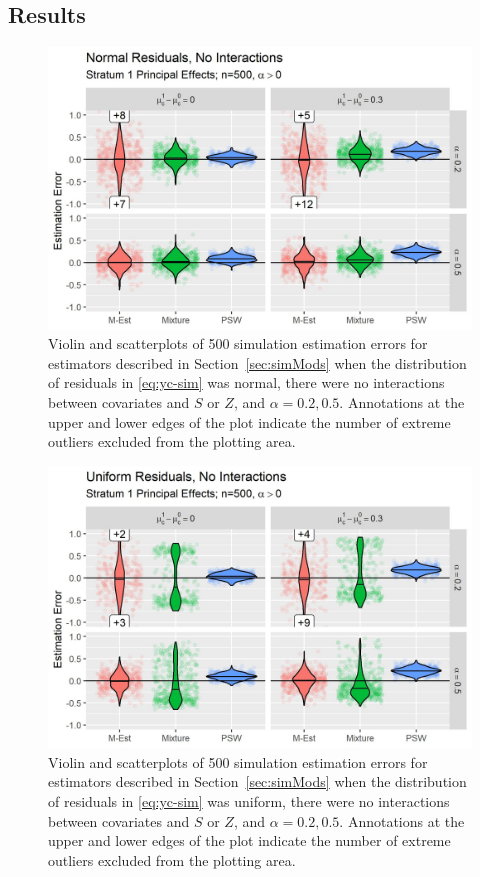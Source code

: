 \documentclass[11pt]{article} %
\begin{document}
\subsection{Results}

\begin{figure}
  \centring
  \includegraphics{../simFigs/normalOutcomesNoInteractionPosB1.jpg}
  \caption{Violin and scatterplots of 500 simulation estimation errors for estimators described in Section~\ref{sec:simMods} when the distribution of residuals in \eqref{eq:yc-sim} was normal, there were no interactions between covariates and $S$ or $Z$, and $\alpha=0.2,0.5$. Annotations at the upper and lower edges of the plot indicate the number of extreme outliers excluded from the plotting area.}
  \label{fig:simNorm}
\end{figure}

\begin{figure}
  \centring
  \includegraphics{../simFigs/unifOutcomesNoInteractionPosB1.jpg}
  \caption{Violin and scatterplots of 500 simulation estimation errors for estimators described in Section~\ref{sec:simMods} when the distribution of residuals in \eqref{eq:yc-sim} was uniform, there were no interactions between covariates and $S$ or $Z$, and $\alpha=0.2,0.5$. Annotations at the upper and lower edges of the plot indicate the number of extreme outliers excluded from the plotting area.}
  \label{fig:simUnif}
\end{figure}
\end{document}
